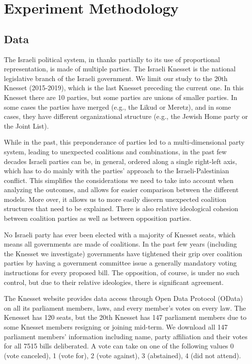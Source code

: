 
\chapter{Experiment Methodology}
\label{ch:experiment}
\vspace{2em}

\section{Data}

The Israeli political system, in thanks partially to its use of
proportional representation, is made of multiple parties.
The Israeli Knesset is the national legislative branch of the Israeli government.
We limit our study to the 20th Knesset (2015-2019), which is the last
Knesset preceding the current one.
In this Knesset there are 10 parties, but some parties are unions of smaller parties.
In some cases the parties have merged (e.g., the Likud or Meretz),
and in some cases, they have different organizational structure
(e.g., the Jewish Home party or the Joint List).

While in the past, this preponderance of parties led to a multi-dimensional
party system, leading to unexpected coalitions and combinations,
in the past few decades Israeli parties can be, in general,
ordered along a single right-left axis, which has to do mainly with
the parties' approach to the Israeli-Palestinian conflict.
This simplifies the considerations we need to take into account when analyzing
the outcomes, and allows for easier comparison between the different models.
More over, it allows us to more easily discern
unexpected coalition structures that need to be explained.
There is also relative ideological cohesion between coalition parties
as well as between opposition parties.

No Israeli party has ever been elected with a majority of Knesset seats,
which means all governments are made of coalitions.
In the past few years (including the Knesset we investigate)
governments have tightened their grip over coalition parties
by having a government committee issue a generally mandatory
voting instructions for every proposed bill.
The opposition, of course, is under no such control,
but due to their relative ideologies, there is significant agreement.

The Knesset website provides data access through Open Data Protocol (OData)
on all its parliament members, laws, and every member's votes on every law.
The Kenesset has 120 seats, but the 20th Knesset has 147 parliament members
due to some Knesset members resigning or joining mid-term.
We download all 147 parliament members' information including name,
party affiliation and their votes for all 7515 bills deliberated.
A vote can take on one of the following values
0 (vote canceled), 1 (vote for), 2 (vote against),
3 (abstained), 4 (did not attend).


